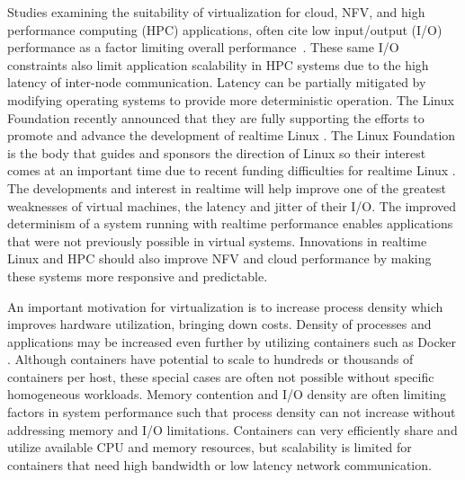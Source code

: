 Studies examining the suitability of virtualization for cloud, NFV, and high performance computing (HPC) applications, often cite low input/output (I/O) performance as a factor limiting overall performance~\autocite{xavier2013performance, _younge_1, des2005virtualization}.
These same I/O constraints also limit application scalability in HPC systems due to the high latency of inter-node communication.
Latency can be partially mitigated by modifying operating systems to provide more deterministic operation. 
The Linux Foundation recently announced that they are fully supporting the efforts to promote and advance the development of realtime Linux \autocite{_linux_foundation_1}.
The Linux Foundation is the body that guides and sponsors the direction of Linux so their interest comes at an important time due to recent funding difficulties for realtime Linux \autocite{_lwn_1}.
The developments and interest in realtime will help improve one of the greatest weaknesses of virtual machines, the latency and jitter of their I/O.
The improved determinism of a system running with realtime performance enables applications that were not previously possible in virtual systems.
Innovations in realtime Linux and HPC should also improve NFV and cloud performance by making these systems more responsive and predictable.

An important motivation for virtualization is to increase process density which improves hardware utilization, bringing down costs.
Density of processes and applications may be increased even further by utilizing containers such as Docker \autocite{dockerdotcom}.
Although containers have potential to scale to hundreds or thousands of containers per host, these special cases are often not possible without specific homogeneous workloads.
Memory contention and I/O density are often limiting factors in system performance such that process density can not increase without addressing memory and I/O limitations.
Containers can very efficiently share and utilize available CPU and memory resources, but scalability is limited for containers that need high bandwidth or low latency network communication.

